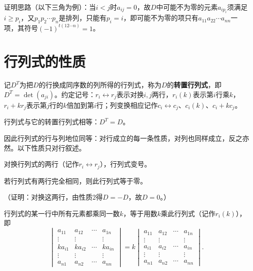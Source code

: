 
证明思路（以下三角为例）：当$i<j$时$a_{ij}=0$，故$D$中可能不为零的元素$a_{ip_i}$须满足$i\ge p_i$，又$p_1p_2\cdots p_n$是排列，只能有$p_i=i$，即可能不为零的项只有$a_{11}a_{22}\cdots a_{nn}$一项，其符号$(-1)^{t(12\cdots n)}=1$。


\section{行列式的性质}

记$D^T$为把$D$的行换成同序数的列所得的行列式，称为$D$的\textbf{转置行列式}，即$D^T=\det(a_{ji})$。约定记号：$r_i\leftrightarrow r_j$表示对换$i,j$两行，$r_i(k)$表示第$i$行乘$k$，$r_i+kr_j$表示第$j$行的$k$倍加到第$i$行；列变换相应记作$c_i\leftrightarrow c_j$、$c_i(k)$、$c_i+kc_j$。

\begin{property}
行列式与它的转置行列式相等：$D^T=D$。
\end{property}

因此行列式的行与列地位同等：对行成立的每一条性质，对列也同样成立，反之亦然。以下性质只对行叙述。

\begin{property}
对换行列式的两行（记作$r_i\leftrightarrow r_j$），行列式变号。
\end{property}

\begin{corollary}
若行列式有两行完全相同，则此行列式等于零。
\end{corollary}

（证明：对换这两行，由性质2得$D=-D$，故$D=0$。）

\begin{property}
行列式的某一行中所有元素都乘同一数$k$，等于用数$k$乘此行列式（记作$r_i(k)$），即
\[
\begin{vmatrix}
a_{11}&a_{12}&\cdots&a_{1n}\\
\vdots&\vdots&&\vdots\\
ka_{i1}&ka_{i2}&\cdots&ka_{in}\\
\vdots&\vdots&&\vdots\\
a_{n1}&a_{n2}&\cdots&a_{nn}
\end{vmatrix}
=k\begin{vmatrix}
a_{11}&a_{12}&\cdots&a_{1n}\\
\vdots&\vdots&&\vdots\\
a_{i1}&a_{i2}&\cdots&a_{in}\\
\vdots&\vdots&&\vdots\\
a_{n1}&a_{n2}&\cdots&a_{nn}
\end{vmatrix}.
\]
\end{property}

